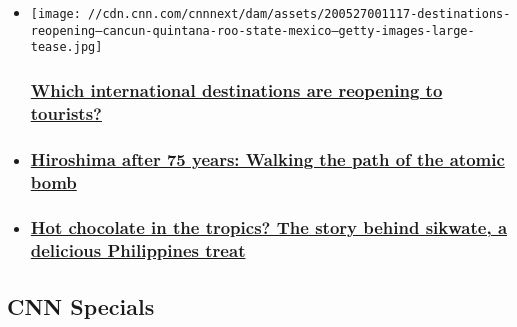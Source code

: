 \begin{itemize}
\item
  \href{/travel/article/global-destinations-reopening-to-tourists/index.html}{}

  \texttt{[image: //cdn.cnn.com/cnnnext/dam/assets/200527001117-destinations-reopening---cancun-quintana-roo-state-mexico---getty-images-large-tease.jpg]}

  \hypertarget{which-international-destinations-are-reopening-to-tourists}{%
  \subsubsection{\texorpdfstring{\href{/travel/article/global-destinations-reopening-to-tourists/index.html}{Which
  international destinations are reopening to
  tourists?}}{Which international destinations are reopening to tourists?}}\label{which-international-destinations-are-reopening-to-tourists}}
\item
  \hypertarget{hiroshima-after-75-years-walking-the-path-of-the-atomic-bomb}{%
  \subsubsection{\texorpdfstring{\href{/travel/article/hiroshima-atomic-bomb-75th-anniversary-intl-hnk/index.html}{Hiroshima
  after 75 years: Walking the path of the atomic
  bomb}}{Hiroshima after 75 years: Walking the path of the atomic bomb}}\label{hiroshima-after-75-years-walking-the-path-of-the-atomic-bomb}}
\item
  \hypertarget{hot-chocolate-in-the-tropics-the-story-behind-sikwate-a-delicious-philippines-treat}{%
  \subsubsection{\texorpdfstring{\href{/travel/article/philippines-sikwate-chocolate/index.html}{Hot
  chocolate in the tropics? The story behind sikwate, a delicious
  Philippines
  treat}}{Hot chocolate in the tropics? The story behind sikwate, a delicious Philippines treat}}\label{hot-chocolate-in-the-tropics-the-story-behind-sikwate-a-delicious-philippines-treat}}
\end{itemize}

\hypertarget{cnn-specials-}{%
\subsection{CNN Specials~}\label{cnn-specials-}}

